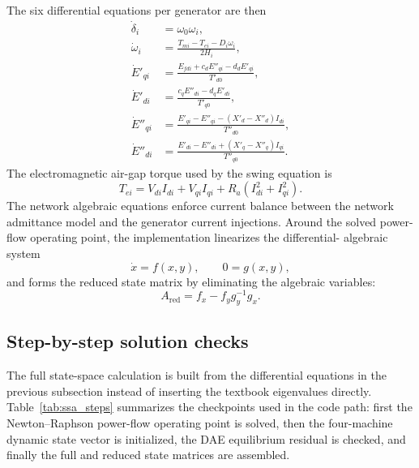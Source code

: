 \documentclass[12pt,a4paper]{article}
\begin{document}
The six differential equations per generator are then
\begin{align}
\dot{\delta}_i &= \omega_0 \omega_i,\\
\dot{\omega}_i &=
\frac{T_{m i}-T_{e i}-D_i\omega_i}{2H_i},\\
\dot{E}'_{q i} &=
\frac{E_{fd i} + c_d E''_{q i} - d_d E'_{q i}}{T'_{d0}},\\
\dot{E}'_{d i} &=
\frac{c_q E''_{d i} - d_q E'_{d i}}{T'_{q0}},\\
\dot{E}''_{q i} &=
\frac{E'_{q i}-E''_{q i}-(X'_d-X''_d)I_{d i}}{T''_{d0}},\\
\dot{E}''_{d i} &=
\frac{E'_{d i}-E''_{d i}+(X'_q-X''_q)I_{q i}}{T''_{q0}}.
\end{align}
The electromagnetic air-gap torque used by the swing equation is
\begin{equation}
T_{e i}=V_{d i}I_{d i}+V_{q i}I_{q i}
        +R_a\left(I_{d i}^{2}+I_{q i}^{2}\right).
\end{equation}
The network algebraic equations enforce current balance between the network
admittance model and the generator current injections. Around the solved
power-flow operating point, the implementation linearizes the differential-
algebraic system
\begin{equation}
\dot{x}=f(x,y), \qquad 0=g(x,y),
\end{equation}
and forms the reduced state matrix by eliminating the algebraic variables:
\begin{equation}
A_{\mathrm{red}} = f_x - f_y g_y^{-1}g_x.
\end{equation}

\subsection{Step-by-step solution checks}

The full state-space calculation is built from the differential equations in
the previous subsection instead of inserting the textbook eigenvalues directly.
Table~\ref{tab:ssa_steps} summarizes the checkpoints used in the code path:
first the Newton--Raphson power-flow operating point is solved, then the
four-machine dynamic state vector is initialized, the DAE equilibrium residual
is checked, and finally the full and reduced state matrices are assembled.

\begin{table}[H]
\centering
\caption{Step-by-step diagnostics for the full 4-machine SSSA calculation.}
\label{tab:ssa_steps}

\end{table}
\end{document}
